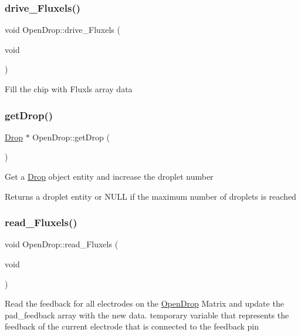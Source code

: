 \subsubsection{\texorpdfstring{drive\+\_\+\+Fluxels()}{drive\_Fluxels()}}
{\footnotesize\ttfamily void Open\+Drop\+::drive\+\_\+\+Fluxels (\begin{DoxyParamCaption}\item[{void}]{ }\end{DoxyParamCaption})}

Fill the chip with Fluxls array data   \mbox{\label{class_open_drop_ac9894f9bc445bff9c94b6ad8de7aa70b}} 
\subsubsection{\texorpdfstring{get\+Drop()}{getDrop()}}
{\footnotesize\ttfamily \mbox{\hyperlink{class_drop}{Drop}} $\ast$ Open\+Drop\+::get\+Drop (\begin{DoxyParamCaption}{ }\end{DoxyParamCaption})}

Get a \mbox{\hyperlink{class_drop}{Drop}} object entity and increase the droplet number \begin{DoxyReturn}{Returns}
a droplet entity or N\+U\+LL if the maximum number of droplets is reached 
\end{DoxyReturn}
\mbox{\label{class_open_drop_a4b531b2101497f257cf80338ecf9536c}} 
\subsubsection{\texorpdfstring{read\+\_\+\+Fluxels()}{read\_Fluxels()}}
{\footnotesize\ttfamily void Open\+Drop\+::read\+\_\+\+Fluxels (\begin{DoxyParamCaption}\item[{void}]{ }\end{DoxyParamCaption})}

Read the feedback for all electrodes on the \mbox{\hyperlink{class_open_drop}{Open\+Drop}} Matrix and update the pad\+\_\+feedback array with the new data.   temporary variable that represents the feedback of the current electrode that is connected to the feedback pin\mbox{\label{class_open_drop_ab9249d33a60f3527cf43a243e84f9fde}} 
